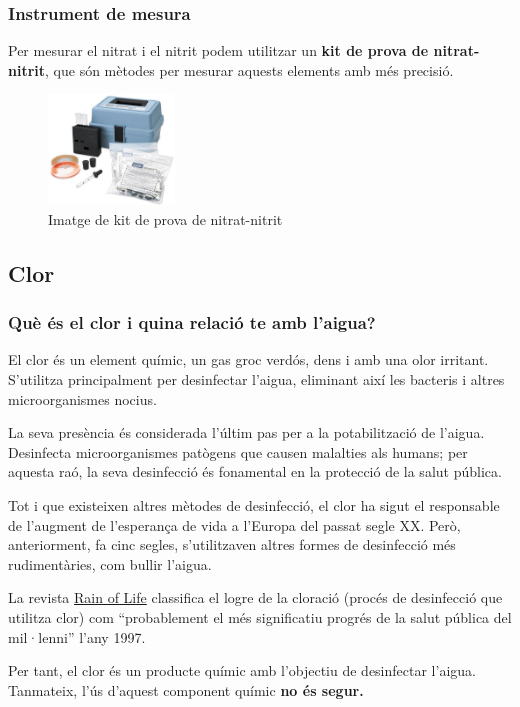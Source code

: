 \subsubsection{Instrument de mesura}
Per mesurar el nitrat i el nitrit podem utilitzar un \textbf{kit de prova de nitrat-nitrit}, que són mètodes per mesurar aquests elements amb més precisió.
\begin{figure}[H]
\centering
\includegraphics[width=0.3\textwidth]{./Figures/nitratnitrit.png}
\caption{Imatge de kit de prova de nitrat-nitrit}
\label{fig:kitnitrats}
\end{figure}

\subsection{Clor} \label{subsec:clor}
\subsubsection{Què és el clor i quina relació te amb l'aigua?}
El clor és un element químic, un gas groc verdós, dens i amb una olor irritant. S'utilitza principalment per desinfectar l'aigua, eliminant així les bacteris i altres microorganismes nocius.

La seva presència és considerada l'últim pas per a la potabilització de l'aigua. Desinfecta microorganismes patògens que causen malalties als humans; per aquesta raó, la seva desinfecció és fonamental en la protecció de la salut pública.

Tot i que existeixen altres mètodes de desinfecció, el clor ha sigut el responsable de l'augment de l'esperança de vida a l'Europa del passat segle XX. Però, anteriorment, fa cinc segles, s'utilitzaven altres formes de desinfecció més rudimentàries, com bullir l'aigua.

La revista \href{https://rainoflife.com/cloro-agua-potable/}{Rain of Life} classifica el logre de la cloració (procés de desinfecció que utilitza clor) com “probablement el més significatiu progrés de la salut pública del mil·lenni” l'any 1997.

Per tant, el clor és un producte químic amb l'objectiu de desinfectar l'aigua. Tanmateix, l'ús d'aquest component químic \textbf{no és segur.}
